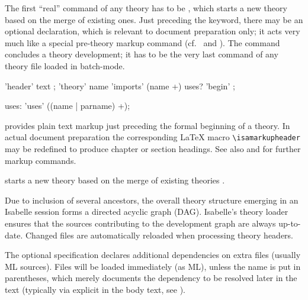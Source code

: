 \begin{isabellebody}
\begin{isamarkuptext}
  The first ``real'' command of any theory has to be , which starts a new theory based on the merge of existing
  ones.  Just preceding the  keyword, there may be
  an optional  declaration, which is relevant to
  document preparation only; it acts very much like a special
  pre-theory markup command (cf.\  and
  ).  The  command concludes a
  theory development; it has to be the very last command of any theory
  file loaded in batch-mode.

  \begin{rail}
    'header' text
    ;
    'theory' name 'imports' (name +) uses? 'begin'
    ;

    uses: 'uses' ((name | parname) +);
  \end{rail}

  \begin{descr}

  \item [\isa{\isacommand{header}}~\isa{text}] provides plain text
  markup just preceding the formal beginning of a theory.  In actual
  document preparation the corresponding {\LaTeX} macro \verb|\isamarkupheader| may be redefined to produce chapter or section
  headings.  See also  and
   for further markup commands.
  
  \item [\isa{\isacommand{theory}}~\isa{A\ {\isasymIMPORTS}\ B\isactrlsub {\isadigit{1}}\ {\isasymdots}\ B\isactrlsub n\ {\isasymBEGIN}}] starts a new theory  based on the
  merge of existing theories .
  
  Due to inclusion of several ancestors, the overall theory structure
  emerging in an Isabelle session forms a directed acyclic graph
  (DAG).  Isabelle's theory loader ensures that the sources
  contributing to the development graph are always up-to-date.
  Changed files are automatically reloaded when processing theory
  headers.
  
  The optional  specification declares additional
  dependencies on extra files (usually ML sources).  Files will be
  loaded immediately (as ML), unless the name is put in parentheses,
  which merely documents the dependency to be resolved later in the
  text (typically via explicit  in the body text,
  see ).
  

\end{descr}
\end{isamarkuptext}
\end{isabellebody}
